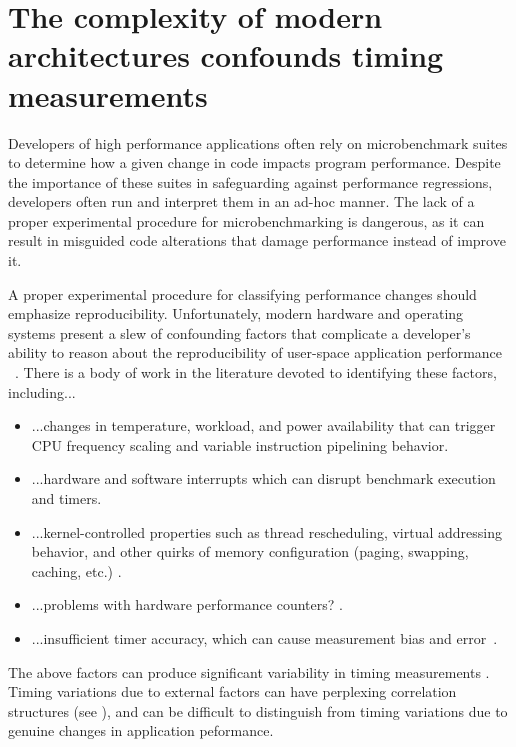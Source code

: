 \documentclass[conference]{IEEEtran}
\begin{document}
\IEEEpeerreviewmaketitle

\label{sec:intro}
\section{The complexity of modern architectures confounds timing measurements}

Developers of high performance applications often rely on microbenchmark suites to determine
how a given change in code impacts program performance. Despite the importance of these
suites in safeguarding against performance regressions, developers often run and
interpret them in an ad-hoc manner. The lack of a proper experimental procedure for
microbenchmarking is dangerous, as it can result in misguided code alterations that damage
performance instead of improve it.

A proper experimental procedure for classifying performance changes should emphasize
reproducibility\cite{Oliveira2014,Kalibera2013}. Unfortunately, modern hardware and
operating systems present a slew of confounding factors that complicate a developer's
ability to reason about the reproducibility of user-space application performance
~\cite{HP5e}. There is a body of work in the literature devoted to identifying these
factors, including...

\begin{itemize}
    \item ...changes in temperature, workload, and power availability that can trigger
    CPU frequency scaling and variable instruction pipelining behavior.
    \item ...hardware and software interrupts which can disrupt benchmark execution
    and timers.
    \item ...kernel-controlled properties such as thread rescheduling, virtual addressing
    behavior, and other quirks of memory configuration (paging, swapping, caching, etc.)
    \cite{Oyama2014,Oyama2016}.
    \item ...problems with hardware performance counters? .
    \item ...insufficient timer accuracy, which can cause measurement bias and
    error~\cite{Mytkowicz2009}.
\end{itemize}

The above factors can produce significant variability in timing measurements .
Timing variations due to external factors can have perplexing correlation structures (see
), and can be difficult to distinguish from timing variations due to genuine
changes in application peformance.
\end{document}
